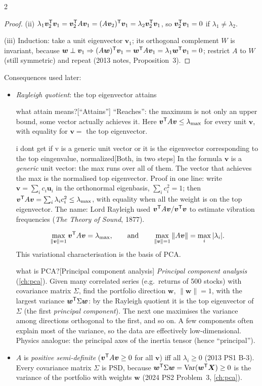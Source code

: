 \begin{paracol}{2}
\begin{proof}
(ii) $\lambda_1\bm v_2^{\mathsf T}\bm v_1=\bm v_2^{\mathsf T} A\bm v_1=(A\bm v_2)^{\mathsf T}\bm v_1=\lambda_2\bm v_2^{\mathsf T}\bm v_1$, so
$\bm v_2^{\mathsf T}\bm v_1=0$ if $\lambda_1\ne\lambda_2$.

(iii) Induction: take a unit eigenvector $\bm v_1$; its orthogonal complement $W$ is invariant, because
$\bm w\perp\bm v_1\Rightarrow (A\bm w)^{\mathsf T}\bm v_1=\bm w^{\mathsf T} A\bm v_1=\lambda_1\bm w^{\mathsf T}\bm v_1=0$; restrict $A$ to $W$ (still
symmetric) and repeat (2013 notes, Proposition~3).
\end{proof}

Consequences used later:
\begin{itemize}
  \item \emph{Rayleigh quotient}: the top eigenvector attains\begin{answer}{what attain means?}[``Attains'']
``Reaches'': the maximum is not only an upper bound, some vector actually achieves it. Here
$\bm v^{\mathsf T} A\bm v\le\lambda_{\max}$ for every unit $\bm v$, with equality for $\bm v=$ the top eigenvector.
\end{answer}\begin{answer}{i dont get if v is a generic unit vector or it is the eigenvector corresponding to the top eingenvalue, normalized}[Both, in two steps]
In the formula $\bm v$ is a \emph{generic} unit vector: the max runs over all of them. The vector that
achieves the max is the normalised top eigenvector. Proof in one line: write $\bm v=\sum_ic_i\bm u_i$ in the
orthonormal eigenbasis, $\sum_ic_i^2=1$; then $\bm v^{\mathsf T} A\bm v=\sum_i\lambda_ic_i^2\le\lambda_{\max}$, with equality
when all the weight is on the top eigenvector. The name: Lord Rayleigh used $\bm v^{\mathsf T} A\bm v/\bm v^{\mathsf T}\bm v$ to
estimate vibration frequencies (\emph{The Theory of Sound}, 1877).
\end{answer}
        \[ \max_{\|\bm v\|=1}\bm v^{\mathsf T} A\bm v=\lambda_{\max},\qquad\text{and}\qquad \max_{\|\bm v\|=1}\|A\bm v\|=\max_i|\lambda_i|. \]
        This variational characterisation is the basis of PCA.\begin{answer}{what is PCA?}[Principal component analysis]
\emph{Principal component analysis} (\cref{ch:pca}). Given many correlated series (e.g.\ returns of 500
stocks) with covariance matrix $\Sigma$, find the portfolio direction $\bm w$, $\|\bm w\|=1$, with the largest
variance $\bm w^{\mathsf T}\Sigma\bm w$: by the Rayleigh quotient it is the top eigenvector of $\Sigma$ (the first
\emph{principal component}). The next one maximises the variance among directions orthogonal to the
first, and so on. A few components often explain most of the variance, so the data are effectively
low-dimensional. Physics analogue: the principal axes of the inertia tensor (hence ``principal'').
\end{answer}
  \item $A$ is \emph{positive semi-definite} ($\bm v^{\mathsf T} A\bm v\ge0$ for all $\bm v$) iff all $\lambda_i\ge0$ (2013 PS1 B-3).
        Every covariance matrix $\Sigma$ is PSD, because $\bm w^{\mathsf T}\Sigma\bm w=\operatorname{Var}(\bm w^{\mathsf T}\bm X)\ge0$ is the variance of
        the portfolio with weights $\bm w$ (2024 PS2 Problem~3, \cref{ch:pca}).
\end{itemize}


\end{paracol}

